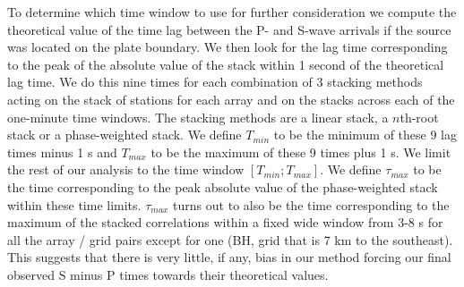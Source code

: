 \documentclass[draft]{agujournal2019}
\begin{document}
To determine which time window to use for further consideration we compute the theoretical value of the time lag between the P- and S-wave arrivals if the source was located on the plate boundary. We then look for the lag time corresponding to the peak of the absolute value of the stack within 1 second of the theoretical lag time. We do this nine times for each combination of 3 stacking methods acting on the stack of stations for each array and on the stacks across each of the one-minute time windows. The stacking methods are a linear stack, a $n$th-root stack or a phase-weighted stack. We define $T_{min}$ to be the minimum of these 9 lag times minus 1 s and $T_{max}$ to be the maximum of these 9 times plus 1 s. We limit the rest of our analysis to the time window $\left[ T_{min} ; T_{max} \right]$. We define $\tau_{max}$ to be the time corresponding to the peak absolute value of the phase-weighted stack within these time limits. $\tau_{max}$ turns out to also be the time corresponding to the maximum of the stacked correlations within a fixed wide window from 3-8 s for all the array / grid pairs except for one (BH, grid that is 7 km to the southeast). This suggests that there is very little, if any, bias in our method forcing our final observed S minus P times towards their theoretical values. \\
\end{document}
